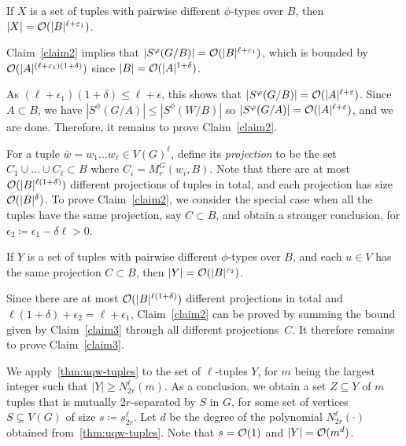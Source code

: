 \begin{claim}\label{claim2}
If $X$ is a set of tuples with pairwise different $\phi$-types over $B$, then $|X|=\mathcal{O}(|B|^{\ell+\varepsilon_1})$.
\end{claim}	

Claim~\ref{claim2} implies that $|S^\varphi(G/B)|=\mathcal{O}(|B|^{\ell+\varepsilon_1})$, 
which is bounded by $\mathcal{O}(|A|^{(\ell+\varepsilon_1)(1+\delta)})$ since $|B|=\mathcal{O}(|A|^{1+\delta})$. 

As $(\ell+\epsilon_1)(1+\delta)\le \ell+\epsilon$, this shows that $|S^\varphi(G/B)|=\mathcal{O}(|A|^{\ell+\varepsilon})$.
Since $A\subset B$, 
we have $|S^\phi(G/A)|\le |S^\phi(W/B)|$ so
 $|S^\varphi(G/A)|=\mathcal{O}(|A|^{\ell+\varepsilon})$, and we are done. Therefore, it remains to prove Claim~\ref{claim2}.

\medskip

For a tuple $\bar w=w_1\ldots w_\ell\in V(G)^\ell$, define its \emph{projection}
to be the set $C_1\cup\ldots\cup C_\ell\subset B$ where  
$C_i=M^G_r(w_i, B)$. Note that there are at most 
$\mathcal{O}(|B|^{\ell(1+\delta)})$ different projections of tuples in total, and each projection has size $\mathcal{O}(|B|^\delta)$.
To prove Claim~\ref{claim2}, we consider the special case when all the tuples have the same projection, say $C\subset B$, and  obtain a stronger conclusion,
for $\epsilon_2\coloneqq \epsilon_1-\delta\ell>0$.

\begin{claim}\label{claim3}
If $Y$ is a set of tuples with pairwise different $\phi$-types over $B$, and each $u\in V$ has the same projection $C\subset B$, then $|Y|=\mathcal{O}(|B|^{\varepsilon_2})$.
\end{claim}

Since there are at most $\mathcal{O}(|B|^{\ell(1+\delta)})$ different projections in total and $\ell(1+\delta)+\epsilon_2=\ell+\epsilon_1$, Claim~\ref{claim2} can be proved
by summing the bound given by Claim~\ref{claim3} through all different projections~$C$.
It therefore remains to prove Claim~\ref{claim3}.

\medskip

We apply~\autoref{thm:uqw-tuples} to the set of $\ell$-tuples $Y$, for $m$ being the largest integer such that $|Y|\ge N^{\ell}_{2r}(m)$.
  As a conclusion, we obtain a set $Z\subseteq Y$ of $m$ tuples that is mutually $2r$-separated by $S$ in $G$, for some set of vertices $S\subseteq V(G)$ of size $s\coloneqq s^{\ell}_{2r}$.
  Let $d$ be the degree of the polynomial $N^\ell_{2r}(\cdot)$ obtained from~\autoref{thm:uqw-tuples}.
  Note that $s=\mathcal{O}(1)$ and $|Y|=\mathcal{O}(m^d)$.
    
